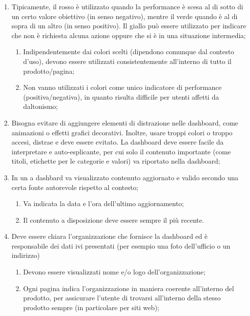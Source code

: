 \begin{enumerate}
    \item Tipicamente, il rosso è utilizzato quando la performance è scesa al di sotto di un certo valore obiettivo (in senso negativo), mentre il verde quando è al di sopra di un altro (in senso positivo). Il giallo può essere utilizzato per indicare che non è richiesta alcuna azione oppure che si è in una situazione intermedia;\label{lg:17}
    \begin{enumerate}
        \item Indipendentemente dai colori scelti (dipendono comunque dal contesto d'uso), devono essere utilizzati consistentemente all'interno di tutto il prodotto/pagina;\label{lg:17.a}
        \item Non vanno utilizzati i colori come unico indicatore di performance (positiva/negativa), in quanto risulta difficile per utenti affetti da daltonismo;
    \end{enumerate}
    \item Bisogna evitare di aggiungere elementi di distrazione nelle dashboard, come animazioni o effetti grafici decorativi. Inoltre, usare troppi colori o troppo accesi, distrae e deve essere evitato. La dashboard deve essere facile da interpretare e auto-esplicante, per cui solo il contenuto importante (come titoli, etichette per le categorie e valori) va riportato nella dashboard;\label{lg:18}
    \item In un a dashbard va visualizzato contenuto aggiornato e valido secondo una certa fonte autorevole rispetto al contesto;\label{lg:19}
    \begin{enumerate}
        \item Va indicata la data e l'ora dell'ultimo aggiornamento;
        \item Il contenuto a disposizione deve essere sempre il più recente.
    \end{enumerate}
    \item Deve essere chiara l'organizzazione che fornisce la dashboard ed è responsabile dei dati ivi presentati (per esempio una foto dell'ufficio o un indirizzo)\label{lg:20}
    \begin{enumerate}
        \item Devono essere visualizzati nome e/o logo dell'organizzazione;
        \item Ogni pagina indica l'organizzazione in maniera coerente all'interno del prodotto, per assicurare l'utente di trovarsi all'interno della stesso prodotto sempre (in particolare per siti web);
    \end{enumerate}

\end{enumerate}
